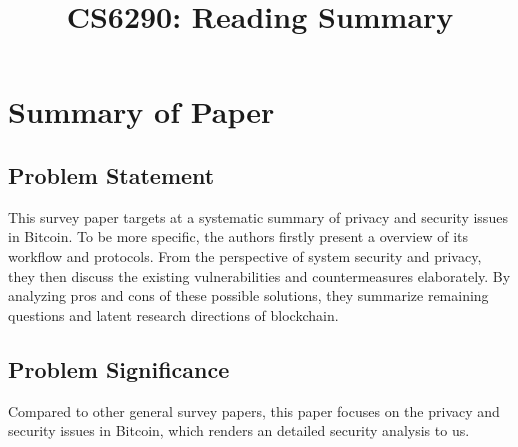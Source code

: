 \documentclass[conference]{IEEEtran}
\begin{document}
\title{CS6290: Reading Summary }

\author{
}

\maketitle

\section{Summary of Paper \cite{conti2018survey}}


\subsection{Problem Statement}
This survey paper targets at a systematic summary of privacy and security issues in Bitcoin.
%
To be more specific, the authors firstly present a overview of its workflow and protocols. 
%
From the perspective of system security and privacy, they then discuss the existing vulnerabilities and countermeasures elaborately.
%
By analyzing pros and cons of these possible solutions, they summarize remaining questions and latent research directions of blockchain.

\subsection{Problem Significance}
Compared to other general survey papers, this paper focuses on the privacy and security issues in Bitcoin, which renders an detailed security analysis to us. 
\end{document}
